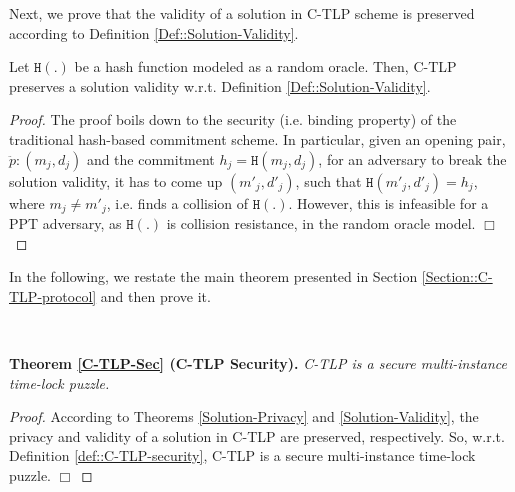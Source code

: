 Next, we prove that the validity of a solution in C-TLP scheme is preserved according to Definition \ref{Def::Solution-Validity}. 
  \begin{theorem} \label{Solution-Validity} Let $\mathtt{H}(.)$ be a hash function modeled as a random oracle. Then, C-TLP preserves a solution validity w.r.t. Definition \ref{Def::Solution-Validity}.  
\end{theorem}
\begin{proof}
 The proof  boils down to  the security (i.e. binding property) of the traditional hash-based commitment scheme. In particular, given an  opening pair, $\ddot{p}:(m_{\scriptscriptstyle j},d_{\scriptscriptstyle j})$ and the commitment $h_{\scriptscriptstyle j}=\mathtt{H}(m_{\scriptscriptstyle j},d_{\scriptscriptstyle j})$, for an adversary to break the solution validity, it has to come up $(m'_{\scriptscriptstyle j},d'_{\scriptscriptstyle j})$, such that $\mathtt{H}(m'_{\scriptscriptstyle j},d'_{\scriptscriptstyle j})=h_{\scriptscriptstyle j}$, where $m_{\scriptscriptstyle j}\neq m'_{\scriptscriptstyle j}$, i.e. finds a collision of $\mathtt{H}(.)$. However, this is infeasible for a PPT adversary, as $\mathtt{H}(.)$ is collision resistance, in the random oracle model. 
 \hfill\(\Box\)
\end{proof}
 
 In the following, we restate the main theorem presented in Section \ref{Section::C-TLP-protocol} and then prove it.  

\

\noindent\textbf{Theorem \ref{C-TLP-Sec} (C-TLP Security).} \textit{C-TLP  is a secure multi-instance time-lock puzzle. }

   
 \begin{proof} According to Theorems \ref{Solution-Privacy} and \ref{Solution-Validity}, the privacy and validity of a solution in C-TLP are preserved, respectively.   So, w.r.t. Definition \ref{def::C-TLP-security}, C-TLP is a secure multi-instance  time-lock puzzle.
  \hfill\(\Box\)
\end{proof}

